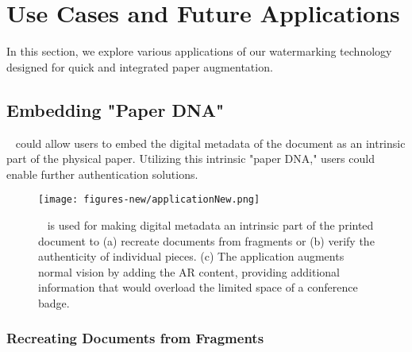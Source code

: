 


\section{Use Cases and Future Applications}
In this section, we explore various applications of our watermarking technology designed for quick and integrated paper augmentation.



\subsection{Embedding "Paper DNA"}
\systemName~ could allow users to embed the digital metadata of the document as an intrinsic part of the physical paper. Utilizing this intrinsic "paper DNA," users could enable further authentication solutions. 



\begin{figure*}[h]
  \centering
  \texttt{[image: figures-new/applicationNew.png]}
  \caption{\systemName~ is used for making digital metadata an intrinsic part of the printed document to (a) recreate documents from fragments or (b) verify the authenticity of individual pieces. (c) The application augments normal vision by adding the AR content, providing additional information that would overload the limited space of a conference badge.}
  \label{fig:ApplicationsAR}
\end{figure*}




\subsubsection{Recreating Documents from Fragments}

